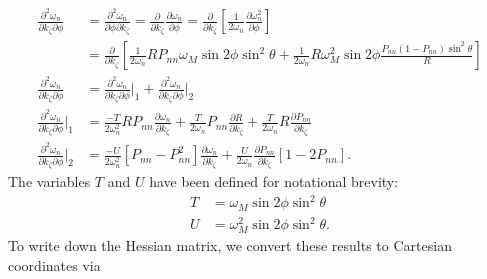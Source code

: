 \documentclass{article}
\begin{document}
\begin{align}
\frac{\partial^2 \omega_{n}}{\partial k_{\zeta} \partial \phi} &= \frac{\partial^2 \omega_{n}}{\partial \phi \partial k_{\zeta}} = \frac{\partial}{\partial k_{\zeta}} \frac{\partial \omega_{n}}{\partial \phi} = \frac{\partial}{\partial k_{\zeta}} \left[\frac{1}{2 \omega_{n}} \frac{\partial \omega_{n}^2}{\partial \phi} \right] \\
&= \frac{\partial}{\partial k_{\zeta}} \left[\frac{1}{2 \omega_{n}} R P_{nn} \omega_{M} \sin{2\phi} \sin^2{\theta} + \frac{1}{2 \omega_{n}} R \omega_{M}^2 \sin{2 \phi} \frac{P_{nn} (1 - P_{nn}) \sin^2{\theta}}{R} \right] \\
\frac{\partial^2 \omega_{n}}{\partial k_{\zeta} \partial \phi} &= \frac{\partial^2 \omega_{n}}{\partial k_{\zeta} \partial \phi}\bigg|_{1} + \frac{\partial^2 \omega_{n}}{\partial k_{\zeta} \partial \phi}\bigg|_{2} \\
\frac{\partial^2 \omega_{n}}{\partial k_{\zeta} \partial \phi}\bigg|_{1} &= \frac{-T}{2 \omega_{n}^2} R P_{nn} \frac{\partial \omega_{n}}{\partial k_{\zeta}} + \frac{T}{2 \omega_{n}} P_{nn} \frac{\partial R}{\partial k_{\zeta}} + \frac{T}{2 \omega_{n}} R \frac{\partial P_{nn}}{\partial k_{\zeta}} \\
\frac{\partial^2 \omega_{n}}{\partial k_{\zeta} \partial \phi}\bigg|_{2} &= \frac{- U}{2\omega_{n}^2} \left[P_{nn} - P_{nn}^2 \right] \frac{\partial \omega_{n}}{\partial k_{\zeta}} + \frac{U}{2 \omega_{n}} \frac{\partial P_{nn}}{\partial k_{\zeta}} \left[1 - 2 P_{nn} \right].
\end{align}
The variables $T$ and $U$ have been defined for notational brevity:
\begin{align}
T &= \omega_{M} \sin{2 \phi} \sin^2{\theta} \\
U &= \omega_{M}^2 \sin{2 \phi} \sin^2{\theta}.
\end{align}
To write down the Hessian matrix, we convert these results to Cartesian coordinates via
\end{document}
